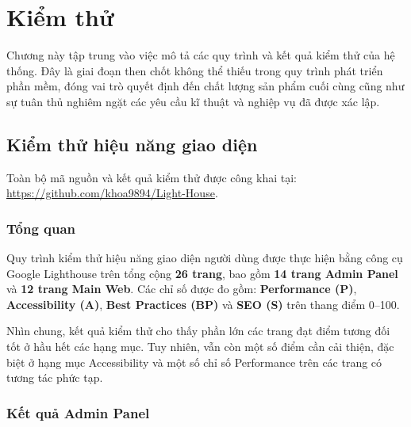 \section{Kiểm thử}
Chương này tập trung vào việc mô tả các quy trình và kết quả kiểm thử của hệ thống. Đây là giai đoạn then chốt không thể thiếu trong quy trình phát triển phần mềm, đóng vai trò quyết định đến chất lượng sản phẩm cuối cùng cũng như sự tuân thủ nghiêm ngặt các yêu cầu kĩ thuật và nghiệp vụ đã được xác lập.

\subsection{Kiểm thử hiệu năng giao diện}
Toàn bộ mã nguồn và kết quả kiểm thử được công khai tại:
\url{https://github.com/khoa9894/Light-House}.
\subsubsection{Tổng quan}

Quy trình kiểm thử hiệu năng giao diện người dùng được thực hiện bằng công cụ Google Lighthouse
trên tổng cộng \textbf{26 trang}, bao gồm \textbf{14 trang Admin Panel} và
\textbf{12 trang Main Web}. Các chỉ số được đo gồm: \textbf{Performance (P)},
\textbf{Accessibility (A)}, \textbf{Best Practices (BP)} và \textbf{SEO (S)}
trên thang điểm 0--100.

Nhìn chung, kết quả kiểm thử cho thấy phần lớn các trang đạt điểm tương đối
tốt ở hầu hết các hạng mục. Tuy nhiên, vẫn còn một số điểm cần cải thiện,
đặc biệt ở hạng mục Accessibility và một số chỉ số Performance trên các
trang có tương tác phức tạp.

\subsubsection{Kết quả Admin Panel}

